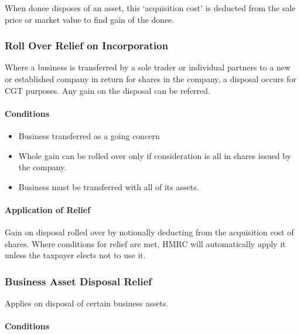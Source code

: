 \documentclass[
]{article}
\providecommand{\tightlist}{%
  \setlength{\itemsep}{0pt}\setlength{\parskip}{0pt}}
\begin{document}
When donee disposes of an asset, this `acquisition cost' is deducted
from the sale price or market value to find gain of the donee.

\hypertarget{roll-over-relief-on-incorporation-1}{%
\subsubsection{Roll Over Relief on
Incorporation}\label{roll-over-relief-on-incorporation-1}}

Where a business is transferred by a sole trader or individual partners
to a new or established company in return for shares in the company, a
disposal occurs for CGT purposes. Any gain on the disposal can be
referred.

\hypertarget{conditions-2}{%
\paragraph{Conditions}\label{conditions-2}}

\begin{itemize}
\tightlist
\item
  Business transferred as a going concern
\item
  Whole gain can be rolled over only if consideration is all in shares
  issued by the company.
\item
  Business must be transferred with all of its assets.
\end{itemize}

\hypertarget{application-of-relief}{%
\paragraph{Application of Relief}\label{application-of-relief}}

Gain on disposal rolled over by notionally deducting from the
acquisition cost of shares. Where conditions for relief are met, HMRC
will automatically apply it unless the taxpayer elects not to use it.

\hypertarget{business-asset-disposal-relief-1}{%
\subsubsection{Business Asset Disposal
Relief}\label{business-asset-disposal-relief-1}}

Applies on disposal of certain business assets.

\hypertarget{conditions-3}{%
\paragraph{Conditions}\label{conditions-3}}
\end{document}
